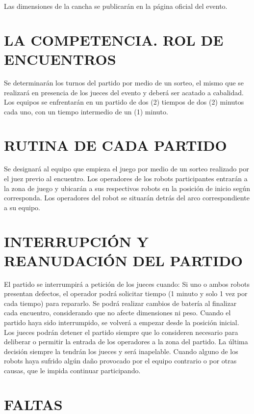 \documentclass[
  letterpaper,
  DIV=11,
  numbers=noendperiod]{scrreprt}
\begin{document}
Las dimensiones de la cancha se publicarán en la página oficial del
evento.

\section{LA COMPETENCIA. ROL DE
ENCUENTROS}\label{la-competencia.-rol-de-encuentros}

Se determinarán los turnos del partido por medio de un sorteo, el mismo
que se realizará en presencia de los jueces del evento y deberá ser
acatado a cabalidad. Los equipos se enfrentarán en un partido de dos (2)
tiempos de dos (2) minutos cada uno, con un tiempo intermedio de un (1)
minuto.

\section{RUTINA DE CADA PARTIDO}\label{rutina-de-cada-partido}

Se designará al equipo que empieza el juego por medio de un sorteo
realizado por el juez previo al encuentro. Los operadores de los robots
participantes entrarán a la zona de juego y ubicarán a sus respectivos
robots en la posición de inicio según corresponda. Los operadores del
robot se situarán detrás del arco correspondiente a su equipo.

\section{INTERRUPCIÓN Y REANUDACIÓN DEL
PARTIDO}\label{interrupciuxf3n-y-reanudaciuxf3n-del-partido}

El partido se interrumpirá a petición de los jueces cuando: Si uno o
ambos robots presentan defectos, el operador podrá solicitar tiempo (1
minuto y solo 1 vez por cada tiempo) para repararlo. Se podrá realizar
cambios de batería al finalizar cada encuentro, considerando que no
afecte dimensiones ni peso. Cuando el partido haya sido interrumpido, se
volverá a empezar desde la posición inicial. Los jueces podrán detener
el partido siempre que lo consideren necesario para deliberar o permitir
la entrada de los operadores a la zona del partido. La última decisión
siempre la tendrán los jueces y será inapelable. Cuando alguno de los
robots haya sufrido algún daño provocado por el equipo contrario o por
otras causas, que le impida continuar participando.

\section{FALTAS}\label{faltas}
\end{document}
